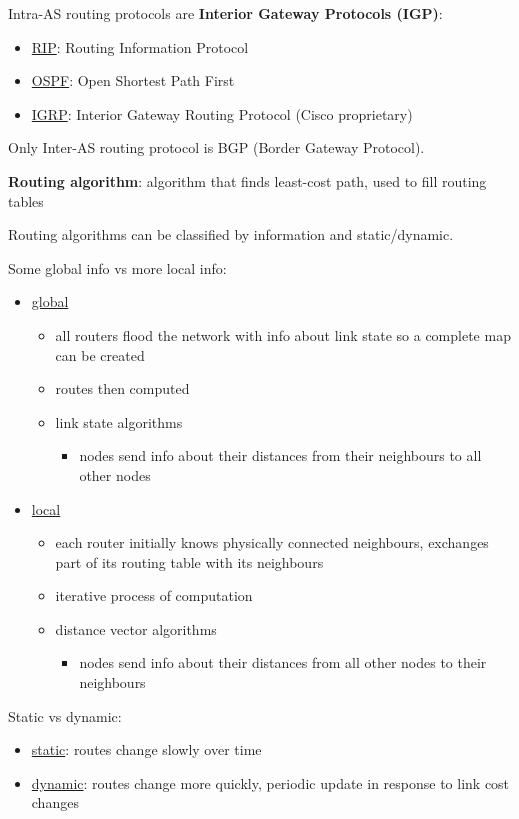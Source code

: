\documentclass[11pt]{article}
\begin{document}
Intra-AS routing protocols are \textbf{Interior Gateway Protocols (IGP)}:
\begin{itemize}
\item \uline{RIP}: Routing Information Protocol
\item \uline{OSPF}: Open Shortest Path First
\item \uline{IGRP}: Interior Gateway Routing Protocol (Cisco proprietary)
\end{itemize}

Only Inter-AS routing protocol is BGP (Border Gateway Protocol).

\textbf{Routing algorithm}: algorithm that finds least-cost path, used to fill routing tables

Routing algorithms can be classified by information and static/dynamic.

Some global info vs more local info:
\begin{itemize}
\item \uline{global}
\begin{itemize}
\item all routers flood the network with info about link state so a complete map can be created
\item routes then computed
\item link state algorithms
\begin{itemize}
\item nodes send info about their distances from their neighbours to all other nodes
\end{itemize}
\end{itemize}
\item \uline{local}
\begin{itemize}
\item each router initially knows physically connected neighbours, exchanges part of its routing table
with its neighbours
\item iterative process of computation
\item distance vector algorithms
\begin{itemize}
\item nodes send info about their distances from all other nodes to their neighbours
\end{itemize}
\end{itemize}
\end{itemize}

Static vs dynamic:
\begin{itemize}
\item \uline{static}: routes change slowly over time
\item \uline{dynamic}: routes change more quickly, periodic update in response to link cost changes
\end{itemize}
\end{document}
